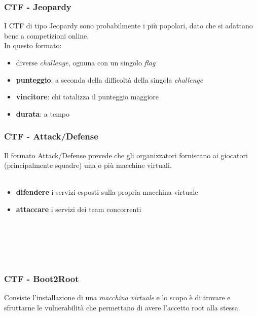 \documentclass{beamer}
\begin{document}
\begin{frame}
    \frametitle{CTF - Jeopardy}
    I CTF di tipo Jeopardy sono probabilmente i più popolari, dato che si adattano bene a competizioni online.
    \\
    In questo formato:
    \begin{itemize}
        \item<1-> diverse \textit{challenge}, ognuna con un singolo \textit{flag}
        \item<2-> \textbf{punteggio}: a seconda della difficoltà della singola \textit{challenge}
        \item<3-> \textbf{vincitore}: chi totalizza il punteggio maggiore
        \item<4-> \textbf{durata}: a tempo
    \end{itemize}

    
    

\end{frame}

\begin{frame}
    \frametitle{CTF - Attack/Defense}
    Il formato Attack/Defense prevede che gli organizzatori 
    forniscano ai giocatori (principalmente squadre) una o più macchine virtuali.
    \\~\\
    \begin{itemize}
        \item <3->\textbf{difendere} i servizi esposti sulla propria macchina virtuale
        \item <4->\textbf{attaccare} i servizi dei team concorrenti
    \end{itemize}
    \leavevmode \\~\\
    \\~\\

\end{frame}

\begin{frame}
    \frametitle{CTF - Boot2Root}
    Consiste l'installazione di una \textit{macchina virtuale} e lo scopo è di trovare e sfruttarne le
    vulnerabilità che permettano di avere l'accetto root alla stessa.
    \\~\\

\end{frame}
\end{document}
